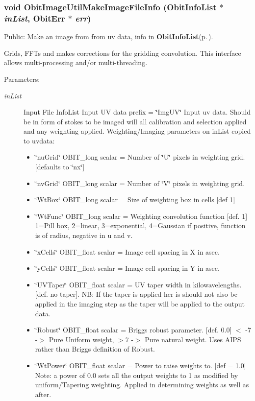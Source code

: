 \subsubsection{\setlength{\rightskip}{0pt plus 5cm}void Obit\-Image\-Util\-Make\-Image\-File\-Info ({\bf Obit\-Info\-List} $\ast$ {\em in\-List}, {\bf Obit\-Err} $\ast$ {\em err})}\label{ObitImageUtil_8c_a6}


Public: Make an image from from uv data, info in {\bf Obit\-Info\-List}{\rm (p.\,\pageref{structObitInfoList})}. 

Grids, FFTs and makes corrections for the gridding convolution. This interface allows multi-processing and/or multi-threading. \begin{Desc}
\item[Parameters:]
\begin{description}
\item[{\em in\-List}]Input File Info\-List Input UV data prefix = \char`\"{}Img\-UV\char`\"{} Input uv data. Should be in form of stokes to be imaged will all calibration and selection applied and any weighting applied. Weighting/Imaging parameters on in\-List copied to uvdata: \begin{itemize}
\item \char`\"{}nu\-Grid\char`\"{} OBIT\_\-long scalar = Number of \char`\"{}U\char`\"{} pixels in weighting grid. [defaults to \char`\"{}nx\char`\"{}] \item \char`\"{}nv\-Grid\char`\"{} OBIT\_\-long scalar = Number of \char`\"{}V\char`\"{} pixels in weighting grid. \item \char`\"{}Wt\-Box\char`\"{} OBIT\_\-long scalar = Size of weighting box in cells [def 1] \item \char`\"{}Wt\-Func\char`\"{} OBIT\_\-long scalar = Weighting convolution function [def. 1] 1=Pill box, 2=linear, 3=exponential, 4=Gaussian if positive, function is of radius, negative in u and v. \item \char`\"{}x\-Cells\char`\"{} OBIT\_\-float scalar = Image cell spacing in X in asec. \item \char`\"{}y\-Cells\char`\"{} OBIT\_\-float scalar = Image cell spacing in Y in asec. \item \char`\"{}UVTaper\char`\"{} OBIT\_\-float scalar = UV taper width in kilowavelengths. [def. no taper]. NB: If the taper is applied her is should not also be applied in the imaging step as the taper will be applied to the output data. \item \char`\"{}Robust\char`\"{} OBIT\_\-float scalar = Briggs robust parameter. [def. 0.0] $<$ -7 -$>$ Pure Uniform weight, $>$7 -$>$ Pure natural weight. Uses AIPS rather than Briggs definition of Robust. \item \char`\"{}Wt\-Power\char`\"{} OBIT\_\-float scalar = Power to raise weights to. [def = 1.0] Note: a power of 0.0 sets all the output weights to 1 as modified by uniform/Tapering weighting. Applied in determining weights as well as after.\end{itemize}

\end{description}
\end{Desc}
